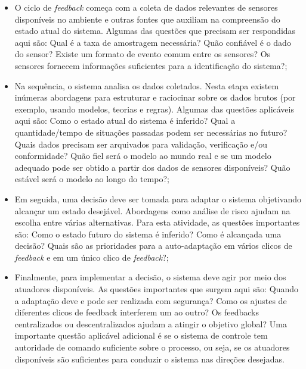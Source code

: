 \documentclass[tid,table]{texufpel} %
\begin{document}
\begin{itemize}

\item O ciclo de \textit{feedback} começa com a coleta de dados relevantes de sensores disponíveis no ambiente e outras fontes que auxiliam na compreensão do estado atual do sistema. Algumas das questões que precisam ser respondidas aqui são: Qual é a taxa de amostragem necessária? Quão confiável é o dado do sensor? Existe um formato de evento comum entre os sensores? Os sensores fornecem informações suficientes para a identificação do sistema?;

\item Na sequência, o sistema analisa os dados coletados. Nesta etapa existem inúmeras abordagens para estruturar e raciocinar sobre os dados brutos (por exemplo, usando modelos, teorias e regras). Algumas das questões aplicáveis aqui são: Como o estado atual do sistema é inferido? Qual a quantidade/tempo de situações passadas podem ser necessárias no futuro? Quais dados precisam ser arquivados para validação, verificação e/ou conformidade? Quão fiel será o modelo ao mundo real e se um modelo adequado pode ser obtido a partir dos dados de sensores disponíveis? Quão estável será o modelo ao longo do tempo?;

\item Em seguida, uma decisão deve ser tomada para adaptar o sistema objetivando alcançar um estado desejável. Abordagens como análise de risco ajudam na escolha entre várias alternativas. Para esta atividade, as questões importantes são: Como o estado futuro do sistema é inferido? Como é alcançada uma decisão? Quais são as prioridades para a auto-adaptação em vários clicos de \textit{feedback} e em um único clico de \textit{feedback}?;

\item Finalmente, para implementar a decisão, o sistema deve agir por meio dos atuadores disponíveis. As questões importantes que surgem aqui são: Quando a adaptação deve e pode ser realizada com segurança? Como os ajustes de diferentes clicos de feedback interferem um ao outro? Os feedbacks centralizados ou descentralizados ajudam a atingir o objetivo global? Uma importante questão aplicável adicional é se o sistema de controle tem autoridade de comando suficiente sobre o processo, ou seja, se os atuadores disponíveis são suficientes para conduzir o sistema nas direções desejadas.

\end{itemize}
\end{document}
